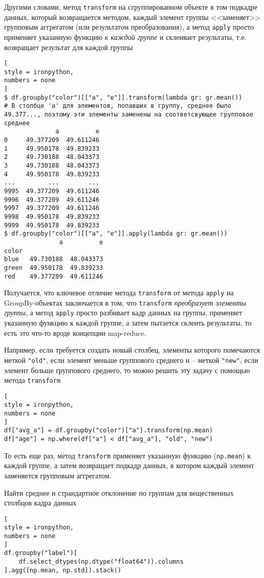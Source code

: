 \documentclass[%
	11pt,
	a4paper,
	utf8,
		]{article}
\begin{document}
Другими словами, метод \verb|transform| на сгруппированном объекте в том подкадре данных, который возвращается методом, каждый элемент группы <<заменяет>> групповым аггрегатом (или результатом преобразования), а метод \verb*|apply| просто применяет указанную функцию \emph{к каждой группе} \cite[]{mckinney:pandas-2015} и склеивает результаты, т.е. возвращает результат для каждой группы
\begin{lstlisting}[
style = ironpython,
numbers = none
]
$ df.groupby("color")[["a", "e"]].transform(lambda gr: gr.mean())
# В столбце 'a' для элементов, попавших в группу, среднее было 49.377..., поэтому эти элементы заменены на соответсвующее групповое среднее
              a          e
0     49.377209  49.611246
1     49.950178  49.839233
2     49.730188  48.043373
3     49.730188  48.043373
4     49.950178  49.839233
...         ...        ...
9995  49.377209  49.611246
9996  49.377209  49.611246
9997  49.377209  49.611246
9998  49.950178  49.839233
9999  49.950178  49.839233
$ df.groupby("color")[["a", "e"]].apply(lambda gr: gr.mean())
               a          e
color
blue   49.730188  48.043373
green  49.950178  49.839233
red    49.377209  49.611246
\end{lstlisting}

Получается, что ключевое отличие метода \verb|transform| от метода \verb|apply| на GroupBy-объектах заключается в том, что \verb|transform| \emph{преобразует элементы группы}, а метод \verb|apply| просто разбивает кадр данных на группы, применяет указанную функцию к каждой группе, а затем пытается склеить результаты, то есть это что-то вроде концепции map-reduce.

Например, если требуется создать новый столбец, элементы которого помечаются меткой \verb|"old"|, если элемент меньше группового среднего и -- меткой \verb|"new"|, если элемент больше группового среднего, то можно решить эту задачу с помощью метода \verb|transform|
\begin{lstlisting}[
style = ironpython,
numbers = none
]
df["avg_a"] = df.groupby("color")["a"].transform(np.mean)
df["age"] = np.where(df["a"] < df["avg_a"], "old", "new")
\end{lstlisting}

То есть еще раз, метод \verb|transform| применяет указанную функцию (\verb|np.mean|) к каждой группе, а затем возвращает подкадр данных, в котором каждый элемент заменяется групповым аггрегатом.

Найти среднее и страндартное отклонение по группам для вещественных столбцов кадра данных
\begin{lstlisting}[
style = ironpython,
numbers = none
]
df.groupby("label")[
    df.select_dtypes(np.dtype("float64")).columns
].agg([np.mean, np.std]).stack()
\end{lstlisting}
\end{document}
